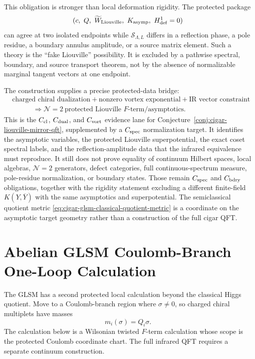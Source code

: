 \begin{remark}
This obligation is stronger than local deformation rigidity.  The protected package
\[
  (c,\ Q,\ \widetilde W_{\rm Liouville},\
    K_{\rm asymp},\ H^1_{\rm def}=0)
\]
can agree at two isolated endpoints while
\({\mathcal S}_{\Lambda,L}\) differs in a reflection phase, a pole residue, a
boundary annulus amplitude, or a source matrix element.  Such a theory is the
``fake Liouville'' possibility.  It is excluded by a pathwise spectral,
boundary, and source transport theorem, not by the absence of normalizable
marginal tangent vectors at one endpoint.
\end{remark}

The construction supplies a precise protected-data bridge:
\[
  \begin{aligned}
  &\text{charged chiral dualization}
  +\text{nonzero vortex exponential}
  +\text{IR vector constraint}
  \\
  &\hspace{3em}\Longrightarrow
  \mathcal N=2\ \text{protected Liouville \(F\)-term/asymptotics}.
  \end{aligned}
\]
This is the \(C_{\rm cl}\), \(C_{\rm dual}\), and \(C_{\rm vort}\) evidence
lane for Conjecture~\ref{conj:cigar-liouville-mirror-qft}, supplemented by a
\(C_{\rm spec}\) normalization target.  It identifies the asymptotic variables,
the protected Liouville superpotential, the exact coset spectral labels, and
the reflection-amplitude data that the infrared equivalence must reproduce.
It still does not prove equality of continuum Hilbert spaces, local algebras,
\(\mathcal N=2\) generators, defect categories, full continuous-spectrum
measure, pole-residue normalization, or boundary states.  Those remain
\(C_{\rm spec}\) and \(C_{\rm bdry}\) obligations, together with the rigidity
statement excluding a different finite-field \(K(Y,\overline Y)\) with the
same asymptotics and superpotential.  The semiclassical quotient metric
\eqref{eq:cigar-glsm-classical-quotient-metric} is a coordinate on the
asymptotic target geometry rather than a construction of the full cigar QFT.

\section{Abelian GLSM Coulomb-Branch One-Loop Calculation}
\label{sec:abelian-glsm-coulomb-one-loop-calculation}

The GLSM has a second protected local calculation beyond the classical Higgs
quotient.  Move to a Coulomb-branch region where
\(\sigma\neq0\), so charged chiral multiplets have masses
\[
  m_i(\sigma)=Q_i\sigma .
\]
The calculation below is a Wilsonian twisted \(F\)-term calculation whose
scope is the protected Coulomb coordinate chart.  The full infrared QFT
requires a separate continuum construction.

